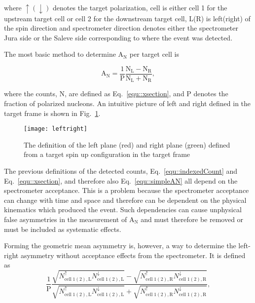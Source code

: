 \noindent
where $\uparrow(\downarrow)$ denotes the target polarization, cell is either
cell 1 for the upstream target cell or cell 2 for the downstream target cell,
L(R) is left(right) of the spin direction and spectrometer direction denotes
either the spectrometer Jura side or the Saleve side corresponding to where the
event was detected. \par

The most basic method to determine A$_{\mathrm{N}}$ per target cell is

\begin{equation}
  \label{equ::simpleAN}
  \mathrm{A}_{\mathrm{N}} = \frac{1}{\mathrm{P}}
  \frac{\mathrm{N}_{\mathrm{L}} -
    \mathrm{N}_{\mathrm{R}}}{\mathrm{N}_{\mathrm{L}} + \mathrm{N}_{\mathrm{R}}},
\end{equation}

\noindent
where the counts, N, are defined as Eq.~\ref{equ::xsection}, and P denotes the
fraction of polarized nucleons.  An intuitive picture of left and right defined
in the target frame is shown in Fig.~\ref{fig::leftright}.

\begin{figure}[h!t]
  \centering
  \texttt{[image: leftright]}
  \caption{The definition of the left plane (red) and right plane (green)
    defined from a target spin up configuration in the target frame}
  \label{fig::leftright}
\end{figure}

The previous definitions of the detected counts, Eq.~\ref{equ::indexedCount}
and Eq.~\ref{equ::xsection}, and therefore also Eq.~\ref{equ::simpleAN} all
depend on the spectrometer acceptance.  This is a problem because the
spectrometer acceptance can change with time and space and therefore can be
dependent on the physical kinematics which produced the event.  Such
dependencies can cause unphysical false asymmetries in the measurement of
A$_{\mathrm{N}}$ and must therefore be removed or must be included as systematic
effects. \par

Forming the geometric mean asymmetry is, however, a way to determine the
left-right asymmetry without acceptance effects from the spectrometer.  It is
defined as
\begin{equation}
  \label{equ::ANgeomean}
  \frac{1}{\mathrm{P}}\frac{\sqrt{N_{\mathrm{cell\;1(2),
          L}}^{\uparrow}N_{\mathrm{cell\;1(2), L}}^{\downarrow}} -
    \sqrt{N_{\mathrm{cell\;1(2), R}}^{\uparrow}N_{\mathrm{cell\;1(2),
          R}}^{\downarrow}} }{\sqrt{N_{\mathrm{cell\;1(2),
          L}}^{\uparrow}N_{\mathrm{cell\;1(2), L}}^{\downarrow}} +
    \sqrt{N_{\mathrm{cell\;1(2), R}}^{\uparrow}N_{\mathrm{cell\;1(2),
          R}}^{\downarrow}} },
\end{equation}

